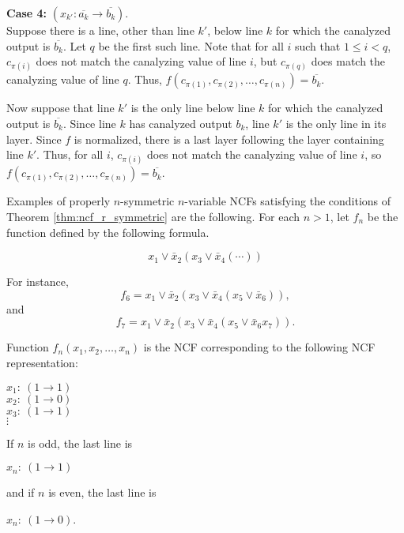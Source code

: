 {\bf Case 4:} $(x_{k'} : \overline{a_k} \rightarrow \overline{b_k})$. \\
Suppose there is a line, other than line $k'$, below line $k$ for which the canalyzed output is $\overline{b_k}$.
Let $q$ be the first such line.
Note that for all $i$ such that $1 \leq i < q$, 
$c_{\pi(i)}$ does not match the canalyzing value of line $i$,
but $c_{\pi(q)}$ does match the canalyzing value of line $q$.
Thus, $f(c_{\pi(1)}, c_{\pi(2)}, \ldots, c_{\pi(n)}) = \overline{b_k}$.

Now suppose that line $k'$ is the only line below line $k$ for which the canalyzed output is $\overline{b_k}$.
Since line $k$ has canalyzed output $b_k$, line $k'$ is the only line in its layer.
Since $f$ is normalized, there is a last layer following the layer containing line $k'$.
Thus, for all $i$, 
$c_{\pi(i)}$ does not match the canalyzing value of line $i$,
so $f(c_{\pi(1)}, c_{\pi(2)}, \ldots, c_{\pi(n)}) = \overline{b_k}$.
\QED


Examples of properly $n$-symmetric $n$-variable NCFs
satisfying the conditions of Theorem \ref{thm:ncf_r_symmetric}
are the following. For each $n > 1$, let $f_n$ be the function defined by the following formula.

$$x_1 \vee \bar{x}_2 ( x_3 \vee \bar{x}_4 (\cdots  ) )$$

For instance,
$$f_6 = x_1 \vee \bar{x}_2 ( x_3 \vee \bar{x}_4 ( x_5 \vee \bar{x}_6  ) ),$$
and
$$f_7 = x_1 \vee \bar{x}_2 ( x_3 \vee \bar{x}_4 ( x_5 \vee \bar{x}_6   x_7) ).$$

Function $f_n(x_1, x_2, \ldots, x_n)$ is the NCF corresponding to the following NCF representation:

\medskip
\noindent
\hspace*{0.5in}
$x_1:~ (1 \rightarrow 1)$ \\
\hspace*{0.5in}
$x_2:~ (1 \rightarrow 0)$ \\
\hspace*{0.5in}
$x_3:~ (1 \rightarrow 1)$ \\
\hspace*{0.75in}
$\vdots$ 

\noindent
If $n$ is odd, the last line is 

\noindent
\hspace*{0.5in}
$x_n:~ (1 \rightarrow 1)$ 

\noindent
and if $n$ is even, the last line is 

\noindent
\hspace*{0.5in}
$x_n:~ (1 \rightarrow 0)$. \\

